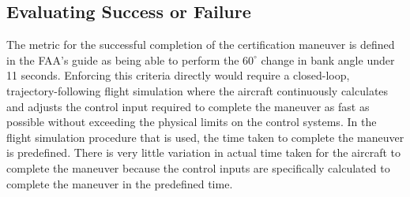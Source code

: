 

\subsection{Evaluating Success or Failure}

The metric for the successful completion of the certification maneuver is defined in the FAA's guide \cite{romanowski_flight_2018} as being able to perform the $60^\circ$ change in bank angle under 11 seconds. 
Enforcing this criteria directly would require a closed-loop, trajectory-following flight simulation where the aircraft continuously calculates and adjusts the control input required to complete the maneuver as fast as possible without exceeding the physical limits on the control systems. 
In the flight simulation procedure that is used, the time taken to complete the maneuver is predefined.
There is very little variation in actual time taken for the aircraft to complete the maneuver because the control inputs are specifically calculated to complete the maneuver in the predefined time.

